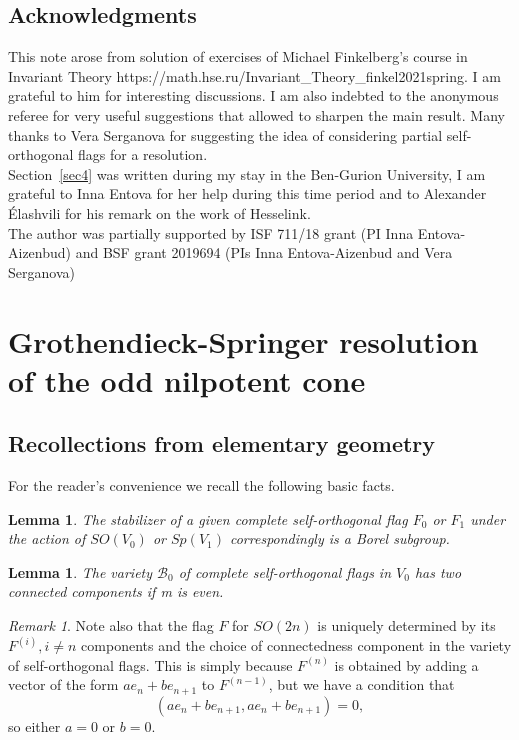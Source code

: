 \documentclass[12pt]{amsart}
\newtheorem{lem}[thm]{Lemma}
\theoremstyle{definition}
\theoremstyle{remark}
\newtheorem{rem}[thm]{Remark}
\numberwithin{equation}{subsection}
\begin{document}
\subsection{Acknowledgments}
This note arose from solution of exercises of Michael Finkelberg's course in Invariant Theory
https://math.hse.ru/Invariant\_Theory\_finkel2021spring. I am grateful to him for interesting
discussions. I am also indebted to the anonymous referee for very useful suggestions that allowed
to sharpen the main result. Many thanks to Vera Serganova for suggesting the idea of considering partial self-orthogonal flags for a resolution.\\
Section~\ref{sec4} was written during my stay in the Ben-Gurion University, I am grateful to Inna Entova for her help during this time period and to Alexander Élashvili for his remark on the work of Hesselink. \\
The author was partially supported by ISF 711/18 grant (PI Inna Entova-Aizenbud) and BSF grant 2019694 (PIs Inna Entova-Aizenbud and Vera Serganova)

    \section{Grothendieck-Springer resolution of the odd nilpotent cone}

    \subsection{Recollections from elementary geometry}
    For the reader's convenience we recall the following basic facts.
    
    \begin{lem}
      \label{lem1}
      The stabilizer of a given complete self-orthogonal flag $F_0$ or $F_1$ under the action of $SO(V_0)$ or $Sp(V_1)$ correspondingly is a Borel subgroup.
      \end{lem}


\begin{lem}
  \label{lem2}
  The variety $\mathcal{B}_0$ of complete self-orthogonal flags in $V_0$ has two connected components if m is even.
\end{lem}



\begin{rem} Note also that the flag $F$ for $SO(2n)$ is uniquely determined by its $F^{(i)},i\neq n$ components and the choice of connectedness component in the variety of self-orthogonal flags. This is simply because $F^{(n)}$ is obtained by adding a vector of the form $ae_n+be_{n+1}$ to $F^{(n-1)}$, but we have a condition that
\begin{equation}
    (ae_n+be_{n+1},ae_n+be_{n+1})=0,
\end{equation}
so either $a=0$ or $b=0$.
\end{rem}
\end{document}
